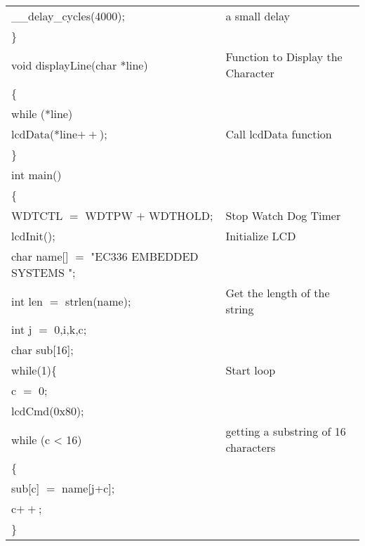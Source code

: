 \documentclass[12pt, letterpaper]{article}
\begin{document}
\begin{longtable}{|p{6cm}||p{5cm}|}
        \hspace{0.1cm} \_\_delay\_cycles(4000); &  a small delay \\
\} & \\

void displayLine(char *line) & Function to Display the Character \\
\{ & \\
        \hspace{0.1cm} while (*line) & \\
         \hspace{0.3cm} lcdData(*line$++$); & Call lcdData function\\
\} & \\

int main() & \\
\{ & \\
        
        \hspace{0.1cm} WDTCTL $=$ WDTPW $+$ WDTHOLD; & Stop Watch Dog Timer\\

        
        \hspace{0.1cm} lcdInit(); & Initialize LCD\\
        
        
         \hspace{0.1cm} char name[] $=$ "EC336 EMBEDDED SYSTEMS "; & \\
        \hspace{0.1cm} int len $=$ strlen(name); & Get the length of the string\\
        \hspace{0.1cm} int j $=$ 0,i,k,c; & \\
        \hspace{0.1cm} char sub[16]; & \\
        
        
        \hspace{0.1cm} while(1)\{ & Start loop\\
          \hspace{0.3cm}      c $=$ 0; & \\
          \hspace{0.3cm}    lcdCmd(0x80); & \\
                
                
 
          \hspace{0.1cm} while (c < 16) & getting a substring of 16 characters\\
               \hspace{0.3cm} \{ & \\
                 \hspace{0.5cm} sub[c] $=$ name[j+c]; & \\
                  \hspace{0.5cm} c$++$;&\\
               \hspace{0.1cm} \}
                

\end{longtable}
\end{document}
